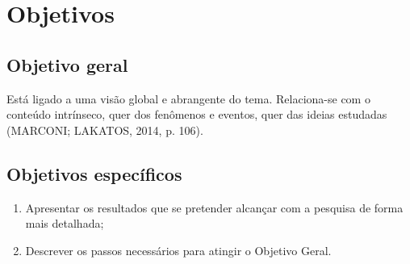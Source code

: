 \chapter{Objetivos}

\section{Objetivo geral}
Está ligado a uma visão global e abrangente do tema. Relaciona-se
com o conteúdo intrínseco, quer dos fenômenos e eventos, quer das ideias
estudadas (MARCONI; LAKATOS, 2014, p. 106).

\section{Objetivos específicos}
\begin{enumerate}
    \item Apresentar os resultados que se pretender alcançar com a pesquisa de
forma mais detalhada;
    \item Descrever os passos necessários para atingir o Objetivo Geral.
\end{enumerate}